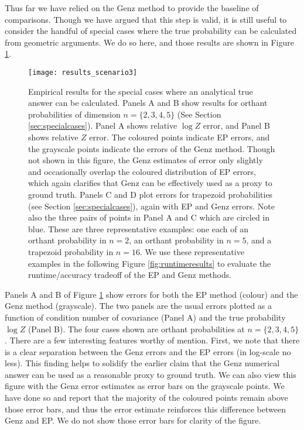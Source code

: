 \documentclass[twoside,11pt]{article}
\begin{document}
Thus far we have relied on the Genz method to provide the baseline of comparisons.  Though we have argued that this step is valid, it is still useful to consider the handful of special cases where the true probability can be calculated from geometric arguments.  We do so here, and those results are shown in Figure \ref{fig:specialresults}.
%
\begin{figure}
\centering
\hspace{0.0cm}
\texttt{[image: results\_scenario3]}
\caption{\small{Empirical results for the special cases where an analytical true answer can be calculated.  Panels A and B show results for orthant probabilities of dimension $n = \{2,3,4,5\}$ (See Section \ref{sec:specialcases}).   Panel A shows relative $\log Z$ error, and Panel B shows relative $Z$ error.  The coloured points indicate EP errors, and the grayscale points indicate the errors of the Genz method.  Though not shown in this figure, the Genz estimates of error only slightly and occasionally overlap the coloured distribution of EP errors, which again clarifies that Genz can be effectively used as a proxy to ground truth. Panels C and D plot errors for trapezoid probabilities (see Section \ref{sec:specialcases}), again with EP and Genz errors.  Note also the three pairs of points in Panel A and C which are circled in blue.  These are three representative examples: one each of an orthant probability in $n=2$, an orthant probability in $n=5$, and a trapezoid probability in $n=16$.  We use these representative examples in the following Figure \ref{fig:runtimeresults} to evaluate the runtime/accuracy tradeoff of the EP and Genz methods.}}
\label{fig:specialresults} %
\end{figure}
%

Panels A and B of Figure \ref{fig:specialresults}  show errors for both the EP method (colour) and the Genz method (grayscale).  The two panels are the usual errors plotted as a function of condition number of covariance (Panel A) and the true probability $\log Z$ (Panel B).   The four cases shown are orthant probabilities at $n = \{2,3,4,5\}$.  There are a few interesting features worthy of mention.  First, we note that there is a clear separation between the Genz errors and the EP errors (in log-scale no less).  This finding helps to solidify the earlier claim that the Genz numerical answer can be used as a reasonable proxy to ground truth.  We can also view this figure with the Genz error estimates as error bars on the grayscale points.  We have done so and report that the majority of the coloured points remain above those error bars, and thus the error estimate reinforces this difference between Genz and EP.  We do not show those error bars for clarity of the figure.
\end{document}
